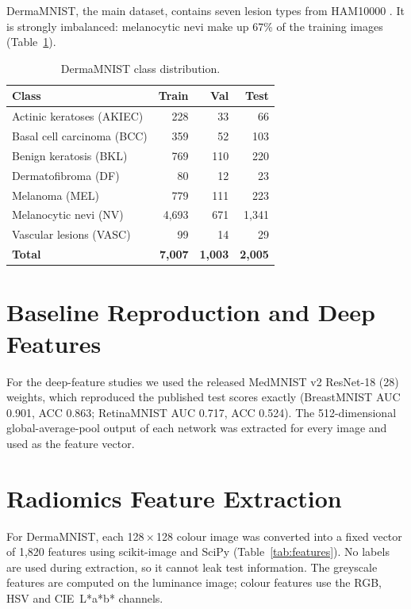 \documentclass[12pt,a4paper]{report}
\begin{document}
DermaMNIST, the main dataset, contains seven lesion types from HAM10000 \cite{tschandl2018}. It is strongly
imbalanced: melanocytic nevi make up 67\% of the training images (Table~\ref{tab:derma}).

\begin{table}[H]
\centering
\caption{DermaMNIST class distribution.}
\label{tab:derma}
\small
\begin{tabular}{|l|r|r|r|}
\hline
\textbf{Class} & \textbf{Train} & \textbf{Val} & \textbf{Test} \\
\hline
Actinic keratoses (AKIEC) & 228 & 33 & 66 \\
Basal cell carcinoma (BCC) & 359 & 52 & 103 \\
Benign keratosis (BKL) & 769 & 110 & 220 \\
Dermatofibroma (DF) & 80 & 12 & 23 \\
Melanoma (MEL) & 779 & 111 & 223 \\
Melanocytic nevi (NV) & 4,693 & 671 & 1,341 \\
Vascular lesions (VASC) & 99 & 14 & 29 \\
\hline
\textbf{Total} & \textbf{7,007} & \textbf{1,003} & \textbf{2,005} \\
\hline
\end{tabular}
\end{table}

\section{Baseline Reproduction and Deep Features}
For the deep-feature studies we used the released MedMNIST v2 ResNet-18 (28) weights, which reproduced the published
test scores exactly (BreastMNIST AUC 0.901, ACC 0.863; RetinaMNIST AUC 0.717, ACC 0.524). The 512-dimensional
global-average-pool output of each network was extracted for every image and used as the feature vector.

\section{Radiomics Feature Extraction}
For DermaMNIST, each 128\,$\times$\,128 colour image was converted into a fixed vector of 1,820 features using
scikit-image and SciPy (Table~\ref{tab:features}). No labels are used during extraction, so it cannot leak test
information. The greyscale features are computed on the luminance image; colour features use the RGB, HSV and
CIE~L*a*b* channels.
\end{document}
